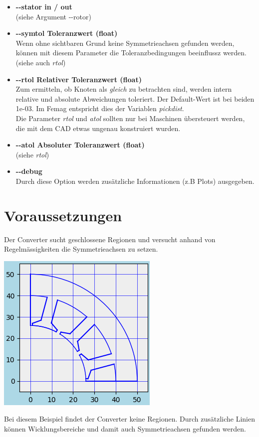 \documentclass[10pt, a4paper,german]{scrartcl}
\newcommand{\Slanted}[1]{{\normalfont\slshape #1}}
\newcommand{\LongArg}[1]{\mbox{{-}{-}#1}}
\begin{document}
\begin{itemize}
\item {\bfseries{\LongArg{stator} in / out}}\\
		(siehe Argument \LongArg{rotor})
		
\item {\bfseries{\LongArg{symtol} Toleranzwert (float)}}\\
		Wenn ohne sichtbaren Grund keine Symmetrieachsen gefunden werden, können mit diesem Parameter
		die Toleranzbedingungen beeinflussz werden.
		(siehe auch \Slanted{rtol})
		
\item {\bfseries{\LongArg{rtol} Relativer Toleranzwert (float)}}\\
		Zum ermitteln, ob Knoten als \Slanted{gleich} zu betrachten sind, werden intern relative
		und absolute Abweichungen toleriert. Der Default-Wert ist bei beiden 1e-03. Im Femag
		entspricht dies der Variablen \Slanted{pickdist}.\\
		Die Parameter \Slanted{rtol} und \Slanted{atol} sollten nur bei Maschinen übersteuert 
		werden, die mit dem CAD etwas ungenau konstruiert wurden.
		
\item {\bfseries{\LongArg{atol} Absoluter Toleranzwert (float)}}\\
		(siehe \Slanted{rtol})
		
\item {\bfseries{\LongArg{debug}}}\\
		Durch diese Option werden zusätzliche Informationen (z.B Plots) ausgegeben.
\end{itemize}

\section{Voraussetzungen}
Der Converter sucht geschlossene Regionen und versucht anhand von Regelmässigkeiten die
Symmetrieachsen zu setzen.
\begin{center}
\includegraphics[width=0.45\linewidth]{BspStator}
\end{center}
Bei diesem Beispiel findet der Converter keine Regionen.
Durch zusätzliche Linien können Wicklungsbereiche und damit auch Symmetrieachsen
gefunden werden.
\end{document}
